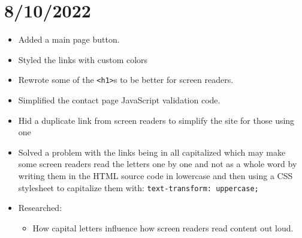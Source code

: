 \documentclass{article}
\begin{document}
\section*{8/10/2022}
\begin{itemize}
	\item Added a main page button.
	\item Styled the links with custom colors
	\item Rewrote some of the \texttt{<h1>}s to be better for screen readers.
	\item Simplified the contact page JavaScript validation code.
	\item Hid a duplicate link from screen readers to simplify the site for those using one
	\item Solved a problem with the links being in all capitalized which may make some screen readers read the letters one by one and not as a whole word by writing them in the HTML source code in lowercase and then using a CSS stylesheet to capitalize them with: \texttt{text-transform: uppercase;}
	\item Researched:
		\begin{itemize} 
	 			\item How capital letters influence how screen readers read content out loud.
		\end{itemize}
\end{itemize}

















































	
\end{document}

